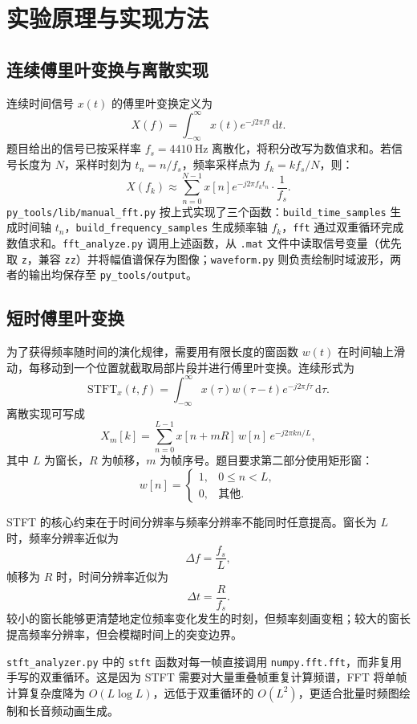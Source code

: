 \documentclass[12pt,a4paper,UTF8]{ctexart}
\begin{document}
\section{实验原理与实现方法}
\subsection{连续傅里叶变换与离散实现}
连续时间信号 $x(t)$ 的傅里叶变换定义为
\[
X(f)=\int_{-\infty}^{\infty} x(t)e^{-j2\pi ft}\,\mathrm{d}t .
\]
题目给出的信号已按采样率 $f_s=4410\ \mathrm{Hz}$ 离散化，将积分改写为数值求和。若信号长度为 $N$，采样时刻为 $t_n=n/f_s$，频率采样点为 $f_k=k f_s/N$，则：
\[
X(f_k)\approx \sum_{n=0}^{N-1}x[n]e^{-j2\pi f_k t_n}\cdot \frac{1}{f_s}.
\]
\texttt{py\_tools/lib/manual\_fft.py} 按上式实现了三个函数：\texttt{build\_time\_samples} 生成时间轴 $t_n$，\texttt{build\_frequency\_samples} 生成频率轴 $f_k$，\texttt{fft} 通过双重循环完成数值求和。\texttt{fft\_analyze.py} 调用上述函数，从 \texttt{.mat} 文件中读取信号变量（优先取 \texttt{z}，兼容 \texttt{zz}）并将幅值谱保存为图像；\texttt{waveform.py} 则负责绘制时域波形，两者的输出均保存至 \texttt{py\_tools/output}。

\subsection{短时傅里叶变换}
为了获得频率随时间的演化规律，需要用有限长度的窗函数 $w(t)$ 在时间轴上滑动，每移动到一个位置就截取局部片段并进行傅里叶变换。连续形式为
\[
\mathrm{STFT}_x(t,f)=\int_{-\infty}^{\infty}x(\tau)w(\tau-t)e^{-j2\pi f\tau}\,\mathrm{d}\tau .
\]
离散实现可写成
\[
X_m[k]=\sum_{n=0}^{L-1}x[n+mR]\,w[n]\,e^{-j2\pi kn/L},
\]
其中 $L$ 为窗长，$R$ 为帧移，$m$ 为帧序号。题目要求第二部分使用矩形窗：
\[
w[n]=
\begin{cases}
1, & 0\le n < L,\\
0, & \text{其他}.
\end{cases}
\]

STFT 的核心约束在于时间分辨率与频率分辨率不能同时任意提高。窗长为 $L$ 时，频率分辨率近似为
\[
\Delta f=\frac{f_s}{L},
\]
帧移为 $R$ 时，时间分辨率近似为
\[
\Delta t=\frac{R}{f_s}.
\]
较小的窗长能够更清楚地定位频率变化发生的时刻，但频率刻画变粗；较大的窗长提高频率分辨率，但会模糊时间上的突变边界。

\texttt{stft\_analyzer.py} 中的 \texttt{stft} 函数对每一帧直接调用 \texttt{numpy.fft.fft}，而非复用手写的双重循环。这是因为 STFT 需要对大量重叠帧重复计算频谱，FFT 将单帧计算复杂度降为 $O(L\log L)$，远低于双重循环的 $O(L^2)$，更适合批量时频图绘制和长音频动画生成。
\end{document}
